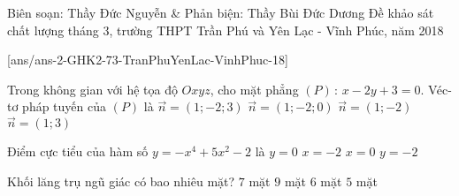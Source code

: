 	\begin{name}
	{Biên soạn: Thầy Đức Nguyễn \& Phản biện: Thầy Bùi Đức Dương}
	{Đề khảo sát chất lượng tháng 3, trường THPT Trần Phú và Yên Lạc - Vĩnh Phúc, năm 2018}
\end{name}
\setcounter{ex}{0}\setcounter{bt}{0}
[ans/ans-2-GHK2-73-TranPhuYenLac-VinhPhuc-18]
\begin{ex}%
Trong không gian với hệ tọa độ $Oxyz$, cho mặt phẳng $(P)\, :\, x-2y+3=0$. Véc-tơ pháp tuyến của $(P)$ là
\choice
{$\overrightarrow{n}=(1;-2;3)$}
{\True $\overrightarrow{n}=(1;-2;0)$}
{$\overrightarrow{n}=(1;-2)$}
{$\overrightarrow{n}=(1;3)$}
\end{ex}
\begin{ex}%
	Điểm cực tiểu của hàm số $y=-x^4+5x^2-2$ là
	\choice
	{$y=0$}
	{$x=-2$}
	{\True $x=0$}
	{$y=-2$}
\end{ex}
\begin{ex}%
Khối lăng trụ ngũ giác có bao nhiêu mặt?
\choice
{\True $7$ mặt}
{$9$ mặt}
{$6$ mặt}
{$5$ mặt}
\end{ex}
